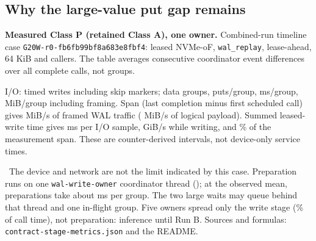 \subsection{Why the large-value put gap remains}\label{sec:contract-stages}
\textbf{Measured Class P (retained Class A), one owner.} Combined-run timeline
case \texttt{G20W-r0-fb6fb99bf8a683e8fbf4}: leased NVMe-oF, \texttt{wal\_replay},
lease-ahead, 64 KiB and  callers.
The table averages consecutive coordinator event differences over all
 complete calls, not groups.

\begin{table}[H]\centering{}
\caption{Class P, one owner. Consecutive \texttt{timeline.records[].events}
\texttt{elapsed\_ns} differences, averaged over all complete calls.
Shares and residual use unrounded values; displayed sums can differ by rounding.
Same-clock intervals, not isolated wire or SSD time.}
\end{table}

I/O:  timed writes including
 skip markers;
 data groups,
 puts/group,
 ms/group,
 MiB/group including framing.
Span (last completion minus first scheduled call) gives  MiB/s
of framed WAL traffic ( MiB/s
of logical payload). Summed leased-write time gives
 ms per I/O sample,
 GiB/s while writing,
and \% of the measurement span.
These are counter-derived intervals, not device-only service times.

\inference\ The device and network are not the limit indicated by this case.
Preparation runs on one \texttt{wal-write-owner} coordinator thread
(); at the observed mean,
 preparations take about
 ms per group.
The two large waits may queue behind that thread and one in-flight group.
Five owners spread only the write stage
(\% of call time), not preparation:
inference until Run B. Sources and formulas: \texttt{contract-stage-metrics.json}
and the README.
